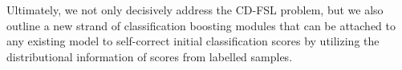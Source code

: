 \documentclass[final]{cvpr}
\begin{document}
Ultimately, we not only decisively address the CD-FSL problem, but we also outline a new strand of classification boosting modules that can be attached to any existing model to self-correct initial classification scores by utilizing the distributional information of scores from labelled samples.

{\small


}
\end{document}
